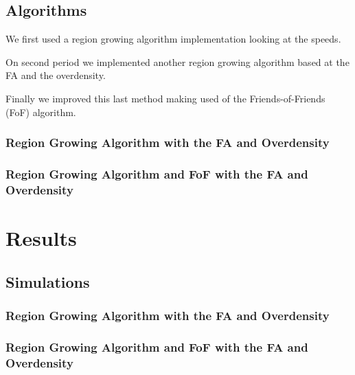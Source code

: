 \documentclass[12pt]{article}
\begin{document}
\subsection{Algorithms}

We first used a region growing algorithm implementation looking at the speeds.

On second period we implemented another region growing algorithm based at the FA and the overdensity.

Finally we improved this last method making used of the Friends-of-Friends (FoF) algorithm.



\subsubsection{Region Growing Algorithm with the FA and Overdensity}


\subsubsection{Region Growing Algorithm and FoF with the FA and Overdensity}






\section{Results}

\subsection{Simulations}



\subsubsection{Region Growing Algorithm with the FA and Overdensity}

\subsubsection{Region Growing Algorithm and FoF with the FA and Overdensity}
\end{document}
